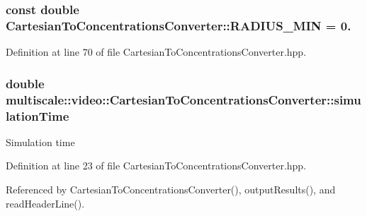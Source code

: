 \hypertarget{classmultiscale_1_1video_1_1CartesianToConcentrationsConverter_a6c96a5325ecd3d99649f9cccff2f06a2}{
\subsubsection[{\-R\-A\-D\-I\-U\-S\-\_\-\-M\-I\-N}]{\setlength{\rightskip}{0pt plus 5cm}const double {\bf \-Cartesian\-To\-Concentrations\-Converter\-::\-R\-A\-D\-I\-U\-S\-\_\-\-M\-I\-N} = 0.}}\label{classmultiscale_1_1video_1_1CartesianToConcentrationsConverter_a6c96a5325ecd3d99649f9cccff2f06a2}


\-Definition at line 70 of file \-Cartesian\-To\-Concentrations\-Converter.\-hpp.

\hypertarget{classmultiscale_1_1video_1_1CartesianToConcentrationsConverter_a6e66af60b82513b3186fdb32cad44597}{
\subsubsection[{simulation\-Time}]{\setlength{\rightskip}{0pt plus 5cm}double {\bf multiscale\-::video\-::\-Cartesian\-To\-Concentrations\-Converter\-::simulation\-Time}}}\label{classmultiscale_1_1video_1_1CartesianToConcentrationsConverter_a6e66af60b82513b3186fdb32cad44597}
\-Simulation time 

\-Definition at line 23 of file \-Cartesian\-To\-Concentrations\-Converter.\-hpp.



\-Referenced by \-Cartesian\-To\-Concentrations\-Converter(), output\-Results(), and read\-Header\-Line().

